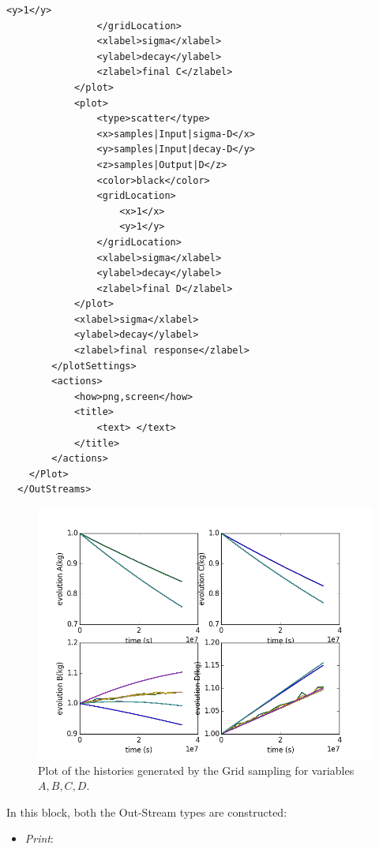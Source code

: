 \begin{enumerate}
\begin{lstlisting}[style=XML,morekeywords={arg,extension,pauseAtEnd,overwrite}]
                    <y>1</y>
                </gridLocation>
                <xlabel>sigma</xlabel>
                <ylabel>decay</ylabel>
                <zlabel>final C</zlabel>
            </plot>
            <plot>
                <type>scatter</type>
                <x>samples|Input|sigma-D</x>
                <y>samples|Input|decay-D</y>
                <z>samples|Output|D</z>
                <color>black</color>
                <gridLocation>
                    <x>1</x>
                    <y>1</y>
                </gridLocation>
                <xlabel>sigma</xlabel>
                <ylabel>decay</ylabel>
                <zlabel>final D</zlabel>
            </plot>
            <xlabel>sigma</xlabel>
            <ylabel>decay</ylabel>
            <zlabel>final response</zlabel>
        </plotSettings>
        <actions>
            <how>png,screen</how>
            <title>
                <text> </text>
            </title>
        </actions>
    </Plot>
  </OutStreams>
\end{lstlisting}
 \begin{figure}[h!]
  \centering
  \includegraphics[scale=0.7]{pics/Grid_histories.png}
  \caption{Plot of the histories generated by the Grid sampling for variables $A,B,C,D$.}
  \label{fig:historiesGridPlotLine}
 \end{figure}
  In this block, both the Out-Stream types are constructed: 
  \begin{itemize}
    \item \textit{Print}: 

\end{itemize}
\end{enumerate}
